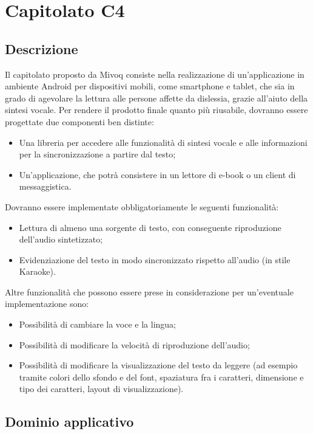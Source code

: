 \newpage
\section{Capitolato C4}

\subsection{Descrizione}

Il capitolato proposto da Mivoq consiste nella realizzazione di un'applicazione
in ambiente Android per dispositivi mobili, come smartphone e tablet,
che sia in grado di agevolare la lettura alle persone affette da dislessia,
grazie all'aiuto della sintesi vocale. Per rendere il prodotto finale
quanto più riusabile, dovranno essere progettate due componenti ben
distinte:
\begin{itemize}
	\item Una libreria per accedere alle funzionalità di sintesi vocale e alle informazioni per la sincronizzazione a partire dal testo;
	\item Un'applicazione, che potrà consistere in un lettore di e-book o un client di messaggistica.
\end{itemize}

Dovranno essere implementate obbligatoriamente
le seguenti funzionalità: 
\begin{itemize}
	\item Lettura di almeno una sorgente di testo,
	con conseguente riproduzione dell'audio sintetizzato;
	\item Evidenziazione del testo in modo sincronizzato rispetto all'audio (in stile Karaoke).
\end{itemize}

Altre funzionalità che possono essere prese in considerazione per un'eventuale implementazione sono: 
\begin{itemize}
	\item Possibilità di cambiare la voce e la lingua;
	\item Possibilità di modificare la velocità di riproduzione dell'audio;
	\item Possibilità di modificare la visualizzazione del testo da leggere (ad esempio tramite colori dello sfondo e del font, spaziatura fra i caratteri, dimensione e tipo dei caratteri, layout di visualizzazione).
\end{itemize}

\subsection{Dominio applicativo}

